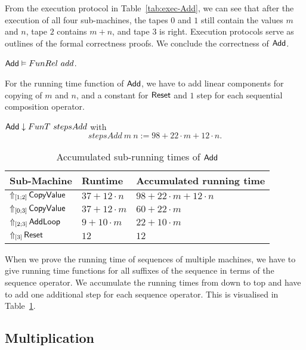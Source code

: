 From the execution protocol in Table~\ref{tab:exec-Add}, we can see that after the execution of all four sub-machines, the tapes $0$ and $1$ still
contain the values $m$ and $n$, tape $2$ contains $m+n$, and tape $3$ is right.  Execution protocols serve as outlines of the formal correctness
proofs.  We conclude the correctness of $\MS{Add}$.
\begin{lemma}
  \label{lem:Add_Computes}
  $\MS{Add} \Realise FunRel~add$.
\end{lemma}

For the running time function of $\MS{Add}$, we have to add linear components for copying of $m$ and $n$, and a constant for $\MS{Reset}$ and $1$ step for
each sequential composition operator.
\begin{lemma}
  $\MS{Add} \downarrow FunT~stepsAdd$ with
  \[
    stepsAdd~m~n := 98 + 22 \cdot m + 12 \cdot n.
  \]
\end{lemma}

\begin{table}[h]
  \centering
  \begin{tabular}{l|l|l}
    Sub-Machine & Runtime & Accumulated running time \\ \hline
    $\LiftTapes{\MS{CopyValue}}{\Vector{1;2}}$  & $37 + 12 \cdot n$ & $98 + 22 \cdot m + 12 \cdot n$ \\
    $\LiftTapes{\MS{CopyValue}}{\Vector{0;3}}$  & $37 + 12 \cdot m$ & $60 + 22 \cdot m$ \\
    $\LiftTapes{\MS{AddLoop}}{\Vector{2;3}}$    & $9 + 10 \cdot m$  & $22 + 10 \cdot m$ \\
    $\LiftTapes{\MS{Reset}}{\Vector{3}}$        & $12$              & $12$ \\
  \end{tabular}
  \caption{Accumulated sub-running times of $\MS{Add}$}
  \label{tab:runningtime-Add}
\end{table}

When we prove the running time of sequences of multiple machines, we have to give running time functions for all suffixes of the sequence in terms of the
sequence operator.  We accumulate the running times from down to top and have to add one additional step for each sequence operator.  This is visualised in
Table~\ref{tab:runningtime-Add}.


\subsection{Multiplication}
\label{sec:Mult}

